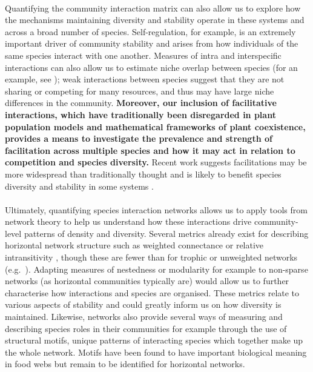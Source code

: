 \documentclass[a4,12pt]{article}
\begin{document}
\begin{refsection}
    \paragraph{}
    Quantifying the community interaction matrix can also allow us to explore how the mechanisms maintaining diversity and stability operate in these systems and across a broad number of species. Self-regulation, for example, is an extremely important driver of community stability \parencite{Barabas2017} and arises from how individuals of the same species interact with one another.     Measures of intra and interspecific interactions can also allow us to estimate niche overlap between species (for an example, see \cite{Chu2015a}); weak interactions between species suggest that they are not sharing or competing for many resources, and thus may have large niche differences in the community. \textbf{Moreover, our inclusion of facilitative interactions, which have traditionally been disregarded in plant population models and mathematical frameworks of plant coexistence, provides a means to investigate the prevalence and strength of facilitation across multiple species and how it may act in relation to competition and species diversity.} Recent work suggests facilitations may be more widespread than traditionally thought \parencite{Gross2015, Picoche2020} and is likely to benefit species diversity and stability in some systems \parencite{Coyte2015, Brooker2008}.

    \paragraph{}
    Ultimately, quantifying species interaction networks allows us to apply tools from network theory to help us understand how these interactions drive community-level patterns of density and diversity. Several metrics already exist for describing horizontal network structure such as weighted connectance \parencite{Ulanowicz1991} or relative intransitivity \parencite{Laird2006a}, though these are fewer than for trophic or unweighted networks (e.g.\ \cite{Bersier2002, Delmas2019}). Adapting measures of nestedness or modularity for example to non-sparse networks (as horizontal communities typically are) would allow us to further characterise how interactions and species are organised. These metrics relate to various aspects of stability and could greatly inform us on how diversity is maintained. Likewise, networks also provide several ways of measuring and describing species roles in their communities \parencite{Cirtwill2018a} for example through the use of structural motifs, unique patterns of interacting species which together make up the whole network. Motifs have been found to have important biological meaning in food webs \parencite{Bascompte2005a} but remain to be identified for horizontal networks. 



\end{refsection}
\end{document}
